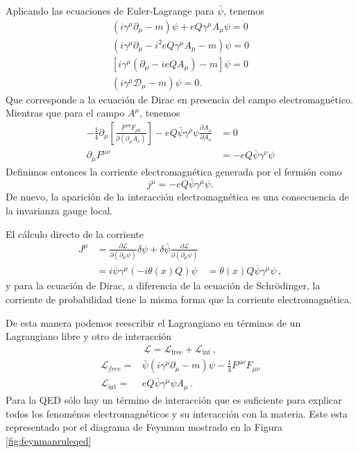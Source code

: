 Aplicando las ecuaciones de Euler-Lagrange para $\bar{\psi}$, tenemos
\begin{align}
  (i\gamma^\mu\partial_\mu-m)\psi+eQ\gamma^\mu A_\mu\psi=0\nonumber\\
  (i\gamma^\mu\partial_\mu-i^2eQ\gamma^\mu A_\mu-m)\psi=0\nonumber\\
  [i\gamma^\mu(\partial_\mu-ieQA_\mu)-m]\psi=0\nonumber\\
  (i\gamma^\mu\mathcal{D}_\mu-m)\psi=0.
\end{align}
Que corresponde a la ecuación de Dirac en presencia del campo electromagnético. Mientras que para el campo $A^\mu$, tenemos
\begin{align}
  -\frac{1}{4}\partial_\mu\left[\frac{F^{\rho\eta}F_{\rho\eta}}{\partial\left(\partial_\mu A_\nu\right)}\right]-eQ\bar{\psi}\gamma^\rho\psi\frac{\partial A_\rho}{\partial A_\nu}&=0\nonumber\\
  \partial_\mu F^{\mu\nu}&=-eQ\bar{\psi}\gamma^\nu\psi
\end{align}
Definimos entonces la corriente electromagnética generada por el fermión como
\begin{equation}
  \label{eq:222qft}
  j^\mu=-eQ\bar{\psi}\gamma^\mu\psi.
\end{equation}
De nuevo, la aparición de la interacción electromagnética es una consecuencia de la invarianza gauge local. 

El cálculo directo de la  corriente 
\begin{align}
  J^\mu&=\frac{\partial\mathcal{L}}{\partial\left(\partial_\mu\psi\right)}\delta\psi+\delta\bar{\psi}\frac{\partial\mathcal{L}}{\partial\left(\partial_\mu\bar{\psi}\right)}\nonumber\\
  &= i\overline{\psi}\gamma^\mu(-i \theta(x) Q ) \psi
  &= \theta(x) Q\overline{\psi}\gamma^\mu \psi\,,
\end{align}
y para la ecuación de Dirac, a diferencia de la ecuación de Schrödinger, la corriente de probabilidad tiene la misma forma que la corriente electromagnética.

De esta manera podemos reescribir el Lagrangiano en términos de un Lagrangiano libre y otro de interacción
\begin{align}
  \mathcal{L}=\mathcal{L}_{\text{free}}+\mathcal{L}_{\text{int}}\,,
\end{align}
\begin{align}
  \mathcal{L}_{free}=&\bar{\psi}\left(i\gamma^\mu\partial_\mu-m\right)\psi-\tfrac{1}{4}F^{\mu\nu}F_{\mu\nu}\nonumber\\
  \mathcal{L}_{\text{int}}=&eQ\bar{\psi}\gamma^\mu\psi A_\mu\,.
\end{align}
Para la QED sólo hay un término de interacción que es suficiente para explicar todos los fenoménos electromagnéticos y su interacción con la materia. Este esta representado por el diagrama de Feynman mostrado en la Figura \ref{fig:feynmanruleqed}

